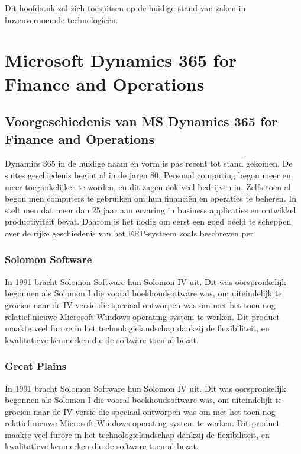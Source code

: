 Dit hoofdstuk zal zich toespitsen op de huidige stand van zaken in bovenvernoemde technologieën.  


\section{Microsoft Dynamics 365 for Finance and Operations}
\subsection{Voorgeschiedenis van MS Dynamics 365 for Finance and Operations}
Dynamics 365 in de huidige naam en vorm is pas recent tot stand gekomen. De suites geschiedenis begint al in de jaren 80. Personal computing begon meer en meer toegankelijker te worden, en dit zagen ook veel bedrijven in. Zelfs toen al begon men  computers te gebruiken om hun financiën en operaties te beheren. In \textcite{Olsen et al.2009} stelt men dat meer dan 25 jaar aan ervaring in business applicaties en ontwikkel productiviteit bevat. Daarom is het nodig om eerst een goed beeld te scheppen over de rijke geschiedenis van het ERP-systeem zoals beschreven per \textcite{Wright2018}

\subsubsection{Solomon Software }
In 1991 bracht Solomon Software hun Solomon IV uit. Dit was oorspronkelijk begonnen als Solomon I die vooral boekhoudsoftware was, om uiteindelijk te groeien naar de IV-versie die speciaal ontworpen was om met het toen nog relatief nieuwe Microsoft Windows operating system te werken. Dit product maakte veel furore in het technologielandschap dankzij de flexibiliteit, en kwalitatieve kenmerken die de software toen al bezat. 


\subsubsection{Great Plains }
In 1991 bracht Solomon Software hun Solomon IV uit. Dit was oorspronkelijk begonnen als Solomon I die vooral boekhoudsoftware was, om uiteindelijk te groeien naar de IV-versie die speciaal ontworpen was om met het toen nog relatief nieuwe Microsoft Windows operating system te werken. Dit product maakte veel furore in het technologielandschap dankzij de flexibiliteit, en kwalitatieve kenmerken die de software toen al bezat. 

